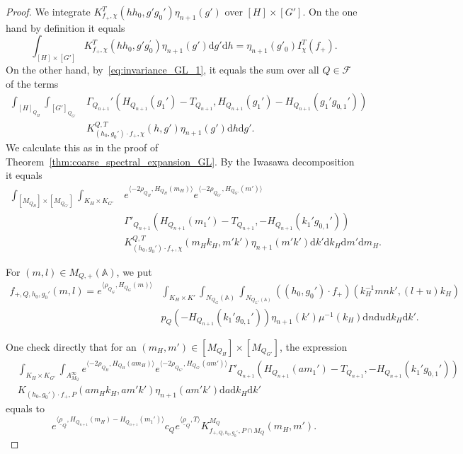 \documentclass[letterpaper,11pt]{amsart}
\newcommand{\bA}{\mathbb{A}}
\newcommand{\cF}{\mathcal{F}}
\newcommand{\rd}{\mathrm{d}}
\newcommand{\<}{\negthickspace}
\theoremstyle{definition}
\theoremstyle{plain}
\theoremstyle{remark}
\numberwithin{equation}{section}
\begin{document}
\begin{proof}
We integrate $K_{f_+,\chi}^T(h h_0, g' g_0') \eta_{n+1}(g')$ over $[H] \times [G']$.
On the one hand by definition it equals
    \[
    \int_{[H] \times [G']}
    K_{f_+,\chi}^T(hh_0,g'g_0^{\prime}) \eta_{n+1}(g') \rd g' \rd h
    =  \eta_{n+1}(g'_0)  I^T_\chi(f_+).
    \]
On the other hand, by~\eqref{eq:invariance_GL_1},
it equals the sum over all $Q \in \cF$ of the terms
    \begin{equation}    \label{eq:invariant_Q_GL}
    \begin{aligned}
    \int_{[H]_{Q_H}} \int_{[G']_{Q_{G'}}}
    &\Gamma_{Q_{n+1}}'(H_{Q_{n+1}}(g_1')-T_{Q_{n+1}},H_{Q_{n+1}}(g_1')
    -H_{Q_{n+1}}(g_1' g_{0,1}'))\\
    & K_{(h_0, g_0') \cdot f_+, \chi}^{Q, T}(h, g')
    \eta_{n+1}(g') \rd h \rd g'.
    \end{aligned}
    \end{equation}
We calculate this as in the proof of
Theorem~\ref{thm:coarse_spectral_expansion_GL}. By the Iwasawa decomposition
it equals
    \begin{equation} \label{eq:invariant_Iwasawa}
            \begin{aligned}
    \int_{[M_{Q_H}] \times [M_{Q_{G'}}]} \int_{K_H \times K_{G'}}
    &e^{\langle -2\rho_{Q_H}, H_{Q_H}(m_H) \rangle}
    e^{\langle -2\rho_{Q_{G'}}, H_{Q_{G'}}(m') \rangle} \\
    &\Gamma'_{Q_{n+1}}(H_{Q_{n+1}}(m_1')-T_{Q_{n+1}},
    -H_{Q_{n+1}}(k_1' g_{0,1}'))\\
    & K_{(h_0, g_0') \cdot f_+,\chi}^{Q,T}(m_H k_H, m'k')
    \eta_{n+1}(m'k') \rd k' \rd k_H \rd m' \rd m_H .
    \end{aligned}
    \end{equation}


For $(m, l) \in M_{Q, +}(\bA)$, we put
    \begin{align*}
    f_{+, Q, h_0, g_0'}(m, l) =
    e^{\langle \rho_{Q_G},H_{Q_G}(m) \rangle}
    &\int_{K_H \times K'} \int_{{N_{Q_G}}(\bA)} \int_{N_{Q_{L^\vee}(\bA)}}
    ((h_0, g_0') \cdot f_+)(k_H^{-1}m n k',(l+ u)k_H)\\
    & p_Q(-H_{Q_{n+1}}(k_1' g_{0,1}')) \eta_{n+1}(k') \mu^{-1}(k_H)
    \rd n \rd  u \rd k_H \rd k'.
    \end{align*}

One check directly that for an $(m_H,m') \in [M_{Q_H}] \times [M_{Q_{G'}}]$, the expression
    \begin{align*}
       & \int_{K_H \times K_{G'}} \int_{A_{M_Q}^\infty}
    e^{\langle -2\rho_{Q_H}, H_{Q_H}(am_H) \rangle}
    e^{\langle -2\rho_{Q_{G'}}, H_{Q_{G'}}(am') \rangle}
    \Gamma'_{Q_{n+1}}(H_{Q_{n+1}}(am_1')-T_{Q_{n+1}},
    -H_{Q_{n+1}}(k_1' g_{0,1}'))\\
    & K_{(h_0, g_0') \cdot f_+,P}(am_H k_H, am'k')
    \eta_{n+1}(am'k')  \rd a \rd k_H \rd k'
    \end{align*}
    equals to
    \[
    e^{\langle \underline{\rho}_Q, H_{Q_{n+1}}(m_H) - H_{Q_{n+1}}(m_1') \rangle} c_Q e^{ \langle \underline{\rho}_Q, T \rangle} K_{f_{+,Q,h_0,g_0'},P \cap M_Q}^{M_Q}(m_H,m').
    \]


\end{proof}
\end{document}
